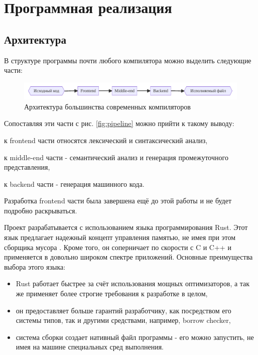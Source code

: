 \chapter{Программная реализация}
\label{ch:chap3_soft_architecture}
\section{Архитектура}
\label{sec:architecture}

В структуре программы почти любого компилятора можно выделить следующие части:

\begin{figure}[H]
    \centering
    \includegraphics[width=\textwidth]{figures/arch}
    \caption{Архитектура большинства современных компиляторов}
    \label{fig:arch}
\end{figure}

Сопоставляя эти части с рис. \ref{fig:pipeline} можно прийти к такому выводу:
\begin{inparaenum}[1)]
    \item к frontend части относятся лексический и синтаксический анализ,
    \item к middle-end части - семантический анализ и генерация промежуточного представления,
    \item к backend части - генерация машинного кода.
\end{inparaenum}
Разработка frontend части была завершена ещё до этой работы и не будет подробно раскрываться.

Проект разрабатывается с использованием языка программирования Rust.
Этот язык предлагает надежный концепт управления памятью, не имея при этом сборщика мусора \cite{RustMemory}.
Кроме того, он соперничает по скорости с C и C++ и применяется в довольно широком спектре приложений.
Основные преимущества выбора этого языка:
\begin{itemize}
    \item Rust работает быстрее за счёт использования мощных оптимизаторов, а так же применяет более строгие требования к разработке в целом,
    \item он предоставляет больше гарантий разработчику, как посредством его системы типов, так и другими средствами, например, borrow checker,
    \item система сборки создает нативный файл программы - его можно запустить, не имея на машине специальных сред выполнения.
\end{itemize}

